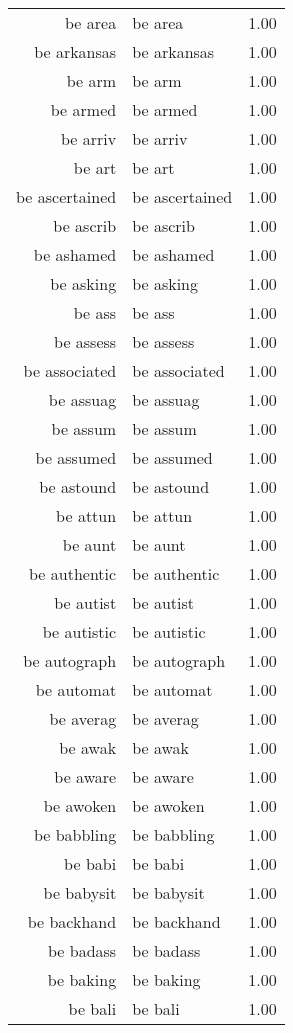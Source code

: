 \begin{table}[ht]
\begin{tabular}{rlr}
  be area & be area & 1.00 \\ 
  be arkansas & be arkansas & 1.00 \\ 
  be arm & be arm & 1.00 \\ 
  be armed & be armed & 1.00 \\ 
  be arriv & be arriv & 1.00 \\ 
  be art & be art & 1.00 \\ 
  be ascertained & be ascertained & 1.00 \\ 
  be ascrib & be ascrib & 1.00 \\ 
  be ashamed & be ashamed & 1.00 \\ 
  be asking & be asking & 1.00 \\ 
  be ass & be ass & 1.00 \\ 
  be assess & be assess & 1.00 \\ 
  be associated & be associated & 1.00 \\ 
  be assuag & be assuag & 1.00 \\ 
  be assum & be assum & 1.00 \\ 
  be assumed & be assumed & 1.00 \\ 
  be astound & be astound & 1.00 \\ 
  be attun & be attun & 1.00 \\ 
  be aunt & be aunt & 1.00 \\ 
  be authentic & be authentic & 1.00 \\ 
  be autist & be autist & 1.00 \\ 
  be autistic & be autistic & 1.00 \\ 
  be autograph & be autograph & 1.00 \\ 
  be automat & be automat & 1.00 \\ 
  be averag & be averag & 1.00 \\ 
  be awak & be awak & 1.00 \\ 
  be aware & be aware & 1.00 \\ 
  be awoken & be awoken & 1.00 \\ 
  be babbling & be babbling & 1.00 \\ 
  be babi & be babi & 1.00 \\ 
  be babysit & be babysit & 1.00 \\ 
  be backhand & be backhand & 1.00 \\ 
  be badass & be badass & 1.00 \\ 
  be baking & be baking & 1.00 \\ 
  be bali & be bali & 1.00 \\ 

\end{tabular}
\end{table}
